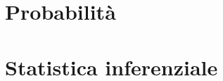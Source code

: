 \documentclass[12pt,openany]{amsbook}
\theoremstyle{plain}
\numberwithin{equation}{section} %
\theoremstyle{definition}
\theoremstyle{remark}
\begin{document}
    

    \tableofcontents

    \part{Probabilità}
    
    
    
    \part{Statistica inferenziale}
    
    
    
\end{document}
